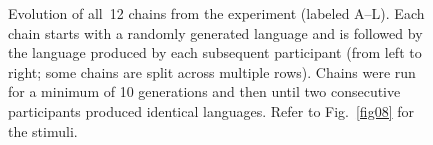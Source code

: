 \documentclass[doc,biblatex]{apa7}
\begin{document}
	\begin{figure}
	\vspace*{2pt}
	\caption{Evolution of all~12 chains from the experiment (labeled A--L). Each chain starts with a randomly generated language and is followed by the language produced by each subsequent participant (from left to right; some chains are split across multiple rows). Chains were run for a minimum of 10 generations and then until two consecutive participants produced identical languages. Refer to Fig.~\ref{fig08} for the stimuli.}
	\label{fig10}
	\end{figure}
\end{document}
